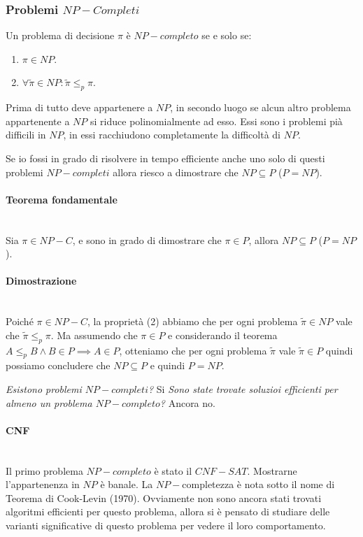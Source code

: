 \documentclass{article}
\begin{document}
\subsubsection{Problemi $NP-Completi$}
Un problema di decisione $\pi$ è $NP-completo$ se e solo se:
\begin{enumerate}
    \item $\pi\in NP$.
    \item $\forall\tilde{\pi}\in NP:\tilde{\pi}\leq_p\pi$.
\end{enumerate}
Prima di tutto deve appartenere a $NP$, in secondo luogo se alcun altro problema appartenente
a $NP$ si riduce polinomialmente ad esso.
Essi sono i problemi pià difficili in $NP$, in essi racchiudono completamente la difficoltà
di $NP$.

Se io fossi in grado di risolvere in tempo efficiente anche uno solo di questi problemi
$NP-completi$ allora riesco a dimostrare che $NP\subseteq P$ ($P=NP$).

\paragraph{Teorema fondamentale}\mbox{}\\
Sia $\pi\in NP-C$, e sono in grado di dimostrare che $\pi\in P$, allora $NP\subseteq P$ ($P=NP$).

\paragraph{Dimostrazione}\mbox{}\\
Poiché $\pi\in NP-C$, la proprietà (2) abbiamo che per ogni problema $\tilde{\pi}\in NP$
vale che $\tilde{\pi}\leq_p\pi$. Ma assumendo che $\pi\in P$ e considerando il teorema
$A\leq_p B\land B\in P\implies A\in P$, otteniamo che per ogni problema $\tilde{\pi}$
vale $\tilde{\pi}\in P$ quindi possiamo concludere che $NP\subseteq P$ e quindi $P=NP$.

\textit{Esistono problemi $NP-completi$?} Si \textit{Sono state trovate soluzioi
    efficienti per almeno un problema $NP-completo$?} Ancora no.

\paragraph{CNF}\mbox{}\\
Il primo problema $NP-completo$ è stato il $CNF-SAT$. Mostrarne l'appartenenza in $NP$
è banale. La $NP-$completezza è nota sotto il nome di Teorema di Cook-Levin (1970).
Ovviamente non sono ancora stati trovati algoritmi efficienti per questo problema,
allora si è pensato di studiare delle varianti significative di questo problema
per vedere il loro comportamento.
\end{document}
